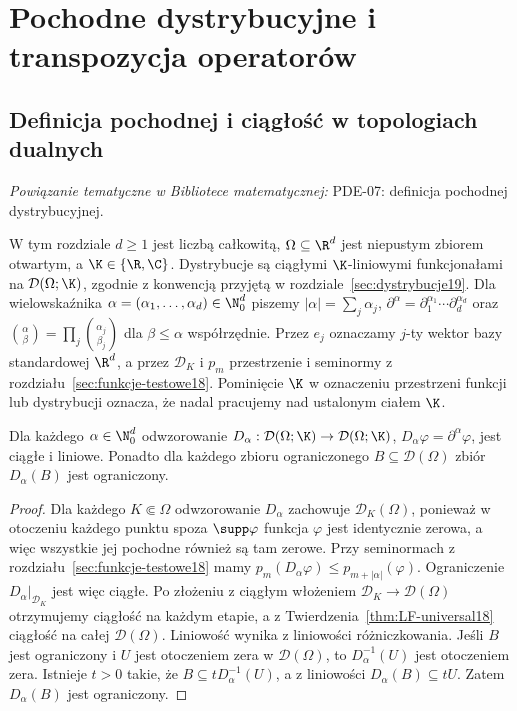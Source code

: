 
\section{Pochodne dystrybucyjne i transpozycja operatorów}
\label{sec:pochodne20}

\providecommand{\atlasref}[2]{#2}


\subsection{Definicja pochodnej i ciągłość w topologiach dualnych}

\noindent\emph{Powiązanie tematyczne w Bibliotece matematycznej:} \atlasref{PDE-07::def:pde7-derivative}{PDE-07: definicja pochodnej dystrybucyjnej}.


W tym rozdziale $d\ge1$ jest liczbą całkowitą,
$\Omega\subseteq\R^d$ jest niepustym zbiorem otwartym,
a $\K\in\{\R,\C\}$. Dystrybucje są
ciągłymi $\K$-liniowymi funkcjonałami na $\mathcal D(\Omega;\K)$, zgodnie
z konwencją przyjętą w rozdziale~\ref{sec:dystrybucje19}.
Dla wielowskaźnika $\alpha=(\alpha_1,\ldots,\alpha_d)\in\N_0^d$
piszemy $|\alpha|=\sum_j\alpha_j$,
$\partial^\alpha=\partial_1^{\alpha_1}\cdots\partial_d^{\alpha_d}$
oraz $\binom\alpha\beta=\prod_j\binom{\alpha_j}{\beta_j}$
dla $\beta\le\alpha$ współrzędnie. Przez $e_j$ oznaczamy
$j$-ty wektor bazy standardowej $\R^d$, a przez $\mathcal D_K$
i $p_m$ przestrzenie i seminormy z rozdziału~\ref{sec:funkcje-testowe18}.
Pominięcie $\K$ w oznaczeniu przestrzeni funkcji lub dystrybucji
oznacza, że nadal pracujemy nad ustalonym ciałem $\K$.

\begin{lemat}
\label{lem:test-derivative20}
Dla każdego $\alpha\in\N_0^d$ odwzorowanie
$D_\alpha:\mathcal D(\Omega;\K)\to\mathcal D(\Omega;\K)$,
$D_\alpha\varphi=\partial^\alpha\varphi$, jest ciągłe i liniowe.
Ponadto dla każdego zbioru ograniczonego $B\subseteq\mathcal D(\Omega)$
zbiór $D_\alpha(B)$ jest ograniczony.
\end{lemat}
\begin{proof}
Dla każdego $K\Subset\Omega$ odwzorowanie $D_\alpha$ zachowuje
$\mathcal D_K(\Omega)$, ponieważ w otoczeniu każdego punktu
spoza $\supp\varphi$ funkcja $\varphi$ jest identycznie zerowa,
a więc wszystkie jej pochodne również są tam zerowe.
Przy seminormach z rozdziału~\ref{sec:funkcje-testowe18} mamy
$p_m(D_\alpha\varphi)\le p_{m+|\alpha|}(\varphi)$.
Ograniczenie $D_\alpha|_{\mathcal D_K}$ jest więc ciągłe.
Po złożeniu z ciągłym włożeniem $\mathcal D_K\to\mathcal D(\Omega)$
otrzymujemy ciągłość na każdym etapie, a z
Twierdzenia~\ref{thm:LF-universal18} ciągłość na całej $\mathcal D(\Omega)$.
Liniowość wynika z liniowości różniczkowania.
Jeśli $B$ jest ograniczony i $U$ jest otoczeniem zera
w $\mathcal D(\Omega)$, to $D_\alpha^{-1}(U)$ jest
otoczeniem zera. Istnieje $t>0$ takie, że
$B\subseteq tD_\alpha^{-1}(U)$, a z liniowości
$D_\alpha(B)\subseteq tU$. Zatem $D_\alpha(B)$ jest ograniczony.
\end{proof}

